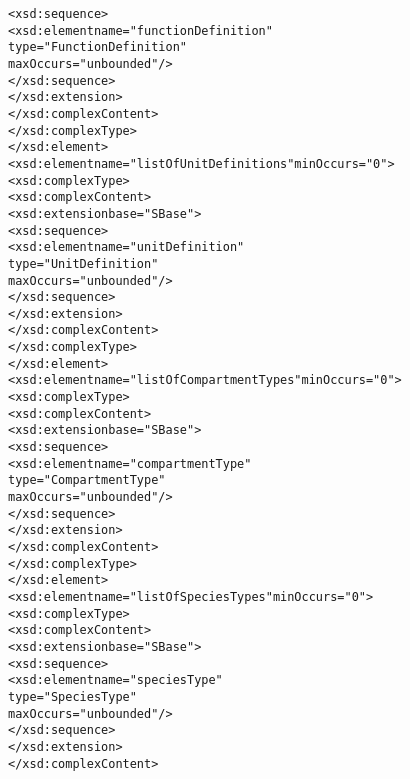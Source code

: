 \begin{alltt}
                                    <xsd:sequence>
                                        <xsd:element name="functionDefinition" 
                                                     type="FunctionDefinition" 
                                                     maxOccurs="unbounded"/>
                                    </xsd:sequence>
                                </xsd:extension>
                            </xsd:complexContent>
                        </xsd:complexType>
                    </xsd:element>
                    <xsd:element name="listOfUnitDefinitions" minOccurs="0">
                        <xsd:complexType>
                            <xsd:complexContent>
                                <xsd:extension base="SBase">
                                    <xsd:sequence>
                                        <xsd:element name="unitDefinition" 
                                                     type="UnitDefinition" 
                                                     maxOccurs="unbounded"/>
                                    </xsd:sequence>
                                </xsd:extension>
                            </xsd:complexContent>
                        </xsd:complexType>
                    </xsd:element>
                    <xsd:element name="listOfCompartmentTypes" minOccurs="0">
                        <xsd:complexType>
                            <xsd:complexContent>
                                <xsd:extension base="SBase">
                                    <xsd:sequence>
                                        <xsd:element name="compartmentType" 
                                                     type="CompartmentType" 
                                                     maxOccurs="unbounded"/>
                                    </xsd:sequence>
                                </xsd:extension>
                            </xsd:complexContent>
                        </xsd:complexType>
                    </xsd:element>
                    <xsd:element name="listOfSpeciesTypes" minOccurs="0">
                        <xsd:complexType>
                            <xsd:complexContent>
                                <xsd:extension base="SBase">
                                    <xsd:sequence>
                                        <xsd:element name="speciesType" 
                                                     type="SpeciesType" 
                                                     maxOccurs="unbounded"/>
                                    </xsd:sequence>
                                </xsd:extension>
                            </xsd:complexContent>

\end{alltt}

